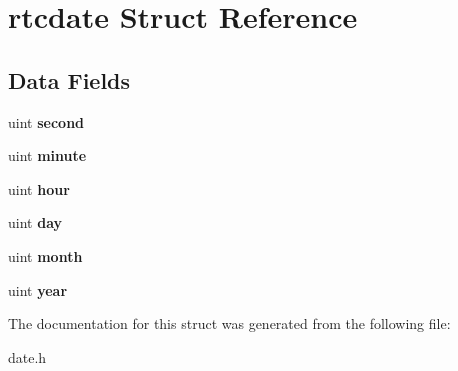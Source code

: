 \hypertarget{structrtcdate}{}\section{rtcdate Struct Reference}
\label{structrtcdate}
\subsection*{Data Fields}
\begin{DoxyCompactItemize}
\item 
\mbox{\label{structrtcdate_affc39128483c500d77d1a012fe045664}} 
uint {\bfseries second}
\item 
\mbox{\label{structrtcdate_a5984e264f332d7634912db2716472aa7}} 
uint {\bfseries minute}
\item 
\mbox{\label{structrtcdate_ac601418b8ff95c35e8fddb47dd3fc77b}} 
uint {\bfseries hour}
\item 
\mbox{\label{structrtcdate_a476a4a04d68d88b1515123aa24af8a4d}} 
uint {\bfseries day}
\item 
\mbox{\label{structrtcdate_a3c509170b31d76f828681c2df54bf0b1}} 
uint {\bfseries month}
\item 
\mbox{\label{structrtcdate_a143aaaa0a5fcaae876c0af5f135ea5c8}} 
uint {\bfseries year}
\end{DoxyCompactItemize}


The documentation for this struct was generated from the following file\+:\begin{DoxyCompactItemize}
\item 
date.\+h\end{DoxyCompactItemize}
